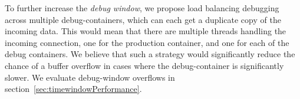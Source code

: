 To further increase the \emph{debug window}, we propose load balancing debugging across multiple debug-containers, which can each get a duplicate copy of the incoming data. 
This would mean that there are multiple threads handling the incoming connection, one for the production container, and one for each of the debug containers.
We believe that such a strategy would significantly reduce the chance of a buffer overflow in cases where the debug-container is significantly slower.
We evaluate debug-window overflows in section~\ref{sec:timewindowPerformance}.